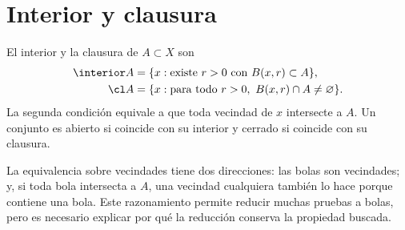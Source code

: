 \section{Interior y clausura}
\begin{definicion}\label{ch02:interiorclausura}
El interior y la clausura de $A\subset X$ son
\begin{align*}
\interior A&=\{x:\text{existe }r>0\text{ con }B(x,r)\subset A\},\\
\cl A&=\{x:\text{para todo }r>0,\ B(x,r)\cap A\ne\varnothing\}.
\end{align*}
La segunda condición equivale a que toda vecindad de $x$ intersecte a $A$. Un conjunto es abierto si coincide con su interior y cerrado si coincide con su clausura.
\end{definicion}
La equivalencia sobre vecindades tiene dos direcciones: las bolas son vecindades; y, si toda bola intersecta a $A$, una vecindad cualquiera también lo hace porque contiene una bola. Este razonamiento permite reducir muchas pruebas a bolas, pero es necesario explicar por qué la reducción conserva la propiedad buscada.

